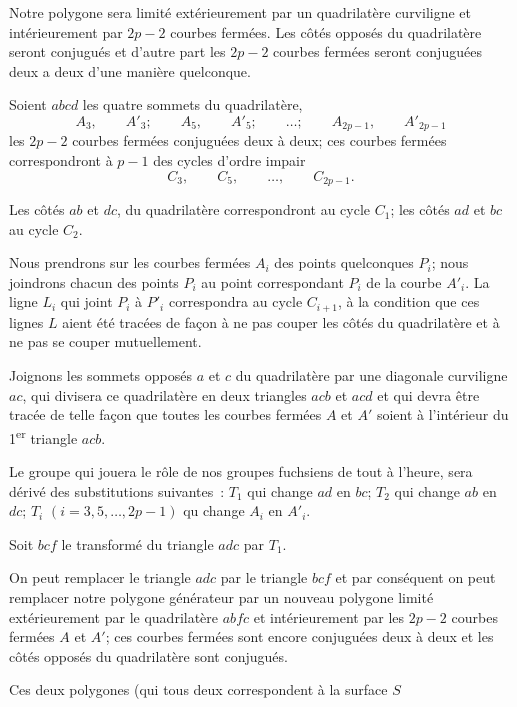\documentclass{article}
\begin{document}
Notre polygone sera limité extérieurement par un quadrilatère curviligne et intérieurement par $2p - 2$ courbes fermées. Les côtés opposés du quadrilatère seront conjugués et d'autre part les $2p - 2$ courbes fermées seront conjuguées deux a deux d'une manière quelconque.

Soient $abcd$ les quatre sommets du quadrilatère,
\[ A_{3}, \qquad A'_{3}; \qquad A_{5}, \qquad A'_{5}; \qquad \ldots; \qquad A_{2p-1}, \qquad A'_{2p-1} \]
les $2p - 2$ courbes fermées conjuguées deux à deux; ces courbes fermées correspondront à $p - 1$ des cycles d'ordre impair
\[ C_{3}, \qquad C_{5}, \qquad \ldots, \qquad C_{2p-1}. \]

Les côtés $ab$ et $dc$, du quadrilatère correspondront au cycle $C_{1}$; les côtés $ad$ et $bc$ au cycle $C_{2}$.

Nous prendrons sur les courbes fermées $A_{i}$ des points quelconques $P_{i}$; nous joindrons chacun des points $P_{i}$ au point correspondant $P_{i}$ de la courbe $A'_{i}$. La ligne $L_{i}$ qui joint $P_{i}$ à $P'_{i}$ correspondra au cycle $C_{i+1}$, à la condition que ces lignes $L$ aient été tracées de façon à ne pas couper les côtés du quadrilatère et à ne pas se couper mutuellement.

Joignons les sommets opposés $a$ et $c$ du quadrilatère par une diagonale curviligne $ac$, qui divisera ce quadrilatère en deux triangles $acb$ et $acd$ et qui devra être tracée de telle façon que toutes les courbes fermées $A$ et $A'$ soient à l'intérieur du 1\textsuperscript{er} triangle $acb$.

Le groupe qui jouera le rôle de nos groupes fuchsiens de tout à l'heure, sera dérivé des substitutions suivantes~: $T_{1}$ qui change $ad$ en $bc$; $T_{2}$ qui change $ab$ en $dc$; $T_{i}$ $(i = 3, 5, \ldots, 2p - 1)$ qu change $A_{i}$ en $A'_{i}$.

Soit $bcf$ le transformé du triangle $adc$ par $T_{1}$.

On peut remplacer le triangle $adc$ par le triangle $bcf$ et par conséquent on peut remplacer notre polygone générateur par un nouveau polygone limité extérieurement par le quadrilatère $abfc$ et intérieurement par les $2p - 2$ courbes fermées $A$ et $A'$; ces courbes fermées sont encore conjuguées deux à deux et les côtés opposés du quadrilatère sont conjugués.

Ces deux polygones (qui tous deux correspondent à la surface $S$
\end{document}
